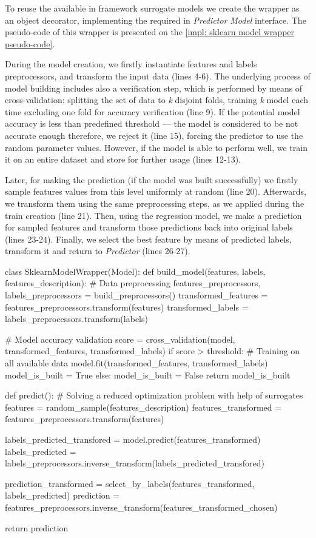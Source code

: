 To reuse the available in framework surrogate models we create the wrapper as an object decorator, implementing the required in \emph{Predictor} \emph{Model} interface. The pseudo-code of this wrapper is presented on the \cref{impl: sklearn model wrapper pseudo-code}.

During the model creation, we firstly instantiate features and labels preprocessors, and transform the input data (lines 4-6). The underlying process of model building includes also a verification step, which is performed by means of cross-validation: splitting the set of data to \textit{k} disjoint folds, training \textit{k} model each time excluding one fold for accuracy verification (line 9). If the potential model accuracy is less than predefined threshold — the model is considered to be not accurate enough therefore, we reject it (line 15), forcing the predictor to use the random parameter values. However, if the model is able to perform well, we train it on an entire dataset and store for further usage (lines 12-13).

Later, for making the prediction (if the model was built successfully) we firstly sample features values from this level uniformly at random (line 20). Afterwards, we transform them using the same preprocessing steps, as we applied during the train creation (line 21). Then, using the regression model, we make a prediction for sampled features and transform those predictions back into original labels (lines 23-24). Finally, we select the best feature by means of predicted labels, transform it and return to \emph{Predictor} (lines 26-27).

\begin{code}[language=Python, caption=Scikit-learn linear model wrapper pseudo-code., label=impl: sklearn model wrapper pseudo-code]
class SklearnModelWrapper(Model):
	def build_model(features, labels, features_description):
		# Data preprocessing
		features_preprocessors, labels_preprocessors = build_preprocessors()
		transformed_features = features_preprocessors.transform(features)
	 	transformed_labels = labels_preprocessors.transform(labels)
	 	
	 	# Model accuracy validation
	 	score = cross_validation(model, transformed_features, transformed_labels)
	 	if score > threshold:
	 		# Training on all available data
	 		model.fit(transformed_features, transformed_labels)
	 		model_is_built = True
	 	else:
	 		model_is_built = False
	 	return model_is_built
	 
	 def predict():
	 	# Solving a reduced optimization problem with help of surrogates
	 	features = random_sample(features_description)
	 	features_transformed = features_preprocessors.transform(features)
	 	
	 	labels_predicted_transfored = model.predict(features_transformed)
	 	labels_predicted = labels_preprocessors.inverse_transform(labels_predicted_transfored)
	 	
	 	prediction_transformed = select_by_labels(features_transformed, labels_predicted)
	 	prediction = features_preprocessors.inverse_transform(features_transformed_chosen)
	 	
		return prediction
\end{code}

